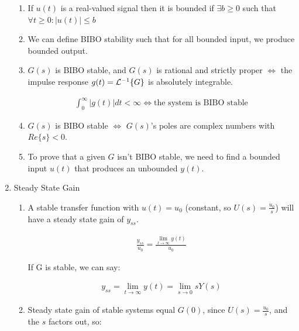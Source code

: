 \begin{enumerate}
        \begin{enumerate}
            \item If $u(t)$ is a real-valued signal then it is bounded if $\exists b\ge 0$ such that $\forall t\ge 0 : |u(t)| \le b$

            \item We can define BIBO stability such that for all bounded input, we produce bounded output.

            \item $G(s)$ is BIBO stable, and $G(s)$ is rational and strictly proper $\iff$ the impulse response $g(t) = \mathcal{L}^{-1}\{G\}$ is absolutely integrable.

            \begin{align*} \int_0^{\infty} |g(t)| dt < \infty \Leftrightarrow \text{the system is BIBO stable}\end{align*}

            \item $G(s)$ is BIBO stable $\Leftrightarrow$ $G(s)$'s poles are complex numbers with $Re\{s\} < 0$.

            \item To prove that a given $G$ isn't BIBO stable, we need to find a bounded input $u(t)$ that produces an unbounded $y(t)$.

        \end{enumerate}
    \item Steady State Gain

        \begin{enumerate}
            \item A stable transfer function with $u(t) = u_0$ (constant, so $U(s) = \frac{u_0}{s}$) will have a steady state gain of $y_{ss}$.

                \begin{align*} \frac{y_{ss}}{u_0} = \frac{\lim_{t \to \infty} y(t)}{u_0} \end{align*}

                If G is stable, we can say:

                \begin{align*} y_{ss} = \lim_{t \to \infty} y(t)  = \lim_{s \to 0} sY(s) \end{align*}

            \item Steady state gain of stable systems equal $G(0)$, since $U(s) = \frac{u_0}{s}$, and the $s$ factors out, so:


\end{enumerate}
\end{enumerate}
